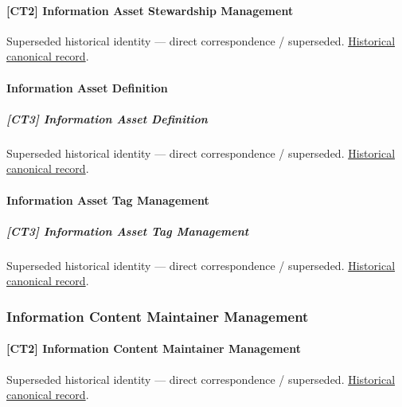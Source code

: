 \paragraph{[CT2] Information Asset Stewardship Management}

\par\label{element:cee085c690314802851de71f4741d8db}
Superseded historical identity — direct correspondence / superseded. \href{../../../../continuum/strategy/capability/cee085c690314802851de71f4741d8db.md}{Historical canonical record}.\par

\paragraph{Information Asset Definition}

\subparagraph{[CT3] Information Asset Definition}

\par\label{element:166a22463d2c4534bda7ae31273398b6}
Superseded historical identity — direct correspondence / superseded. \href{../../../../continuum/strategy/capability/166a22463d2c4534bda7ae31273398b6.md}{Historical canonical record}.\par

\paragraph{Information Asset Tag Management}

\subparagraph{[CT3] Information Asset Tag Management}

\par\label{element:ae44a4ee78414d1098814315793bd751}
Superseded historical identity — direct correspondence / superseded. \href{../../../../continuum/strategy/capability/ae44a4ee78414d1098814315793bd751.md}{Historical canonical record}.\par

\subsubsection{Information Content Maintainer Management}

\paragraph{[CT2] Information Content Maintainer Management}

\par\label{element:acb977e879204f1491293e5452e0ddf0}
Superseded historical identity — direct correspondence / superseded. \href{../../../../continuum/strategy/capability/acb977e879204f1491293e5452e0ddf0.md}{Historical canonical record}.\par

